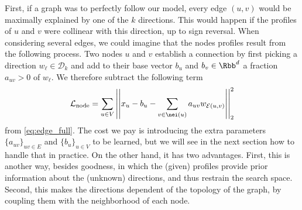 First, if a graph was to perfectly follow our model, every edge $(u,v)$ would be maximally explained
by one of the $k$ directions. This would happen if the profiles of $u$ and $v$ were collinear with
this direction, up to sign reversal. When considering several edges, we could imagine that the nodes
profiles result from the following process. Two nodes $u$ and $v$ establish a connection by first
picking a direction $w_\ell \in \mathcal{D}_k$ and add to their base vector $b_u$ and $b_v \in
\Rbb^d$ a fraction $a_{uv} > 0$ of $w_\ell$. We therefore subtract the following term
\begin{equation}
  \label{eq:edge_node_loss}
  \mathcal{L}_{\mathrm{node}} =
  \sum_{u\in V} \left|\left| x_u - b_u -
  \sum_{v \in \nei(u)} a_{uv} w_{\mathcal{E}(u,v)} \right|\right|^2_2
\end{equation}
from \eqref{eq:edge_full}. The cost we pay is introducing the extra parameters $\{a_{uv}\}_{uv \in
E}$ and $\{b_u\}_{u \in V}$ to be learned, but we will see in the next section how to handle that in
practice. On the other hand, it has two advantages. First, this is another way, besides goodness, in
which the (given) profiles provide prior information about the (unknown) directions, and thus
restrain the search space. Second, this makes the directions dependent of the topology of the graph,
by coupling them with the neighborhood of each node.


